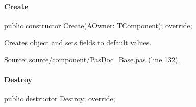 \documentclass{report}
\newif\ifpdf
\begin{document}
\paragraph*{Create}\hspace*{\fill}

\label{PasDoc_Base.TPasDoc-Create}
\begin{list}{}{
\setlength{\itemindent}{0cm}
\setlength{\listparindent}{0cm}
\setlength{\leftmargin}{\evensidemargin}
\addtolength{\leftmargin}{\tmplength}
\settowidth{\labelsep}{X}
\addtolength{\leftmargin}{\labelsep}
\setlength{\labelwidth}{\tmplength}
}
\item[\textbf{Declaration}\hfill]
\ifpdf
\begin{flushleft}
\fi
\begin{ttfamily}
public constructor Create(AOwner: TComponent); override;\end{ttfamily}

\ifpdf
\end{flushleft}
\fi

\par
\item[\textbf{Description}]
Creates object and sets fields to default values.\par
\href{https://github.com/pasdoc/pasdoc/blob/master/source/component/PasDoc_Base.pas#L132}{Source: source/component/PasDoc{\_}Base.pas (line 132).}

\end{list}
\paragraph*{Destroy}\hspace*{\fill}

\label{PasDoc_Base.TPasDoc-Destroy}
\begin{list}{}{
\setlength{\itemindent}{0cm}
\setlength{\listparindent}{0cm}
\setlength{\leftmargin}{\evensidemargin}
\addtolength{\leftmargin}{\tmplength}
\settowidth{\labelsep}{X}
\addtolength{\leftmargin}{\labelsep}
\setlength{\labelwidth}{\tmplength}
}
\item[\textbf{Declaration}\hfill]
\ifpdf
\begin{flushleft}
\fi
\begin{ttfamily}
public destructor Destroy; override;\end{ttfamily}

\ifpdf
\end{flushleft}
\fi

\end{list}
\end{document}
